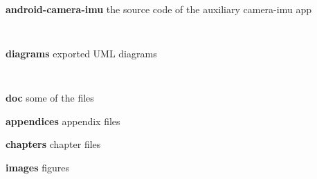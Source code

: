 \texttt{ }\par
\noindent \textbf{android-camera-imu} the source code of the auxiliary camera-imu app\par
\texttt{ }\par
\noindent \textbf{diagrams} exported UML diagrams\par
\texttt{ }\par
\noindent \textbf{doc} some of the  files\par
\noindent \textbf{appendices} appendix  files\par
\noindent \textbf{chapters} chapter  files\par
\noindent \textbf{images} figures\par